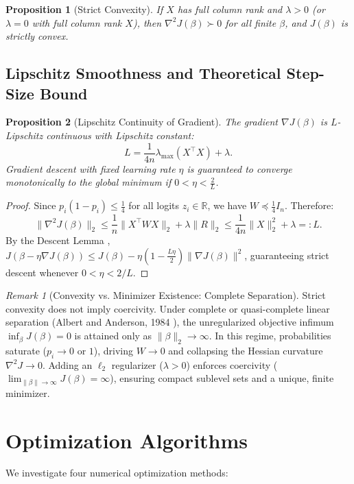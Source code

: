 \documentclass[11pt,a4paper]{article}
\newtheorem{proposition}{Proposition}
\theoremstyle{remark}\newtheorem{remark}{Remark}
\begin{document}
\begin{proposition}[Strict Convexity]
If $X$ has full column rank and $\lambda > 0$ (or $\lambda = 0$ with full column rank $X$), then $\nabla^2 J(\beta) \succ 0$ for all finite $\beta$, and $J(\beta)$ is strictly convex.
\end{proposition}

\subsection{Lipschitz Smoothness and Theoretical Step-Size Bound}
\begin{proposition}[Lipschitz Continuity of Gradient]
The gradient $\nabla J(\beta)$ is $L$-Lipschitz continuous with Lipschitz constant:
\begin{equation}
  L = \frac{1}{4n} \lambda_{\max}(X^\top X) + \lambda.
\end{equation}
Gradient descent with fixed learning rate $\eta$ is guaranteed to converge monotonically to the global minimum if $0 < \eta < \frac{2}{L}$.
\end{proposition}
\begin{proof}
Since $p_i (1 - p_i) \le \frac{1}{4}$ for all logits $z_i \in \mathbb{R}$, we have $W \preceq \frac{1}{4} I_n$. Therefore:
\begin{equation}
  \|\nabla^2 J(\beta)\|_2 \le \frac{1}{n} \|X^\top W X\|_2 + \lambda \|R\|_2 \le \frac{1}{4n} \|X\|_2^2 + \lambda =: L.
\end{equation}
By the Descent Lemma \cite{nocedal2006}, $J(\beta - \eta \nabla J(\beta)) \le J(\beta) - \eta(1 - \frac{L\eta}{2})\|\nabla J(\beta)\|^2$, guaranteeing strict descent whenever $0 < \eta < 2/L$.
\end{proof}

\begin{remark}[Convexity vs. Minimizer Existence: Complete Separation]
Strict convexity does not imply coercivity. Under complete or quasi-complete linear separation (Albert and Anderson, 1984 \cite{bishop2006}), the unregularized objective infimum $\inf_\beta J(\beta) = 0$ is attained only as $\|\beta\|_2 \to \infty$. In this regime, probabilities saturate ($p_i \to 0$ or $1$), driving $W \to 0$ and collapsing the Hessian curvature $\nabla^2 J \to 0$. Adding an $\ell_2$ regularizer ($\lambda > 0$) enforces coercivity ($\lim_{\|\beta\|\to\infty} J(\beta) = \infty$), ensuring compact sublevel sets and a unique, finite minimizer.
\end{remark}

\section{Optimization Algorithms}
We investigate four numerical optimization methods:
\end{document}
